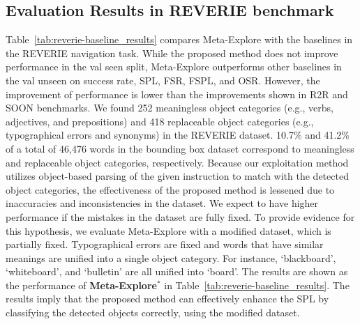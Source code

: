 \documentclass[10pt,twocolumn,letterpaper]{article}
\begin{document}
\subsection{Evaluation Results in REVERIE benchmark}
Table~\ref{tab:reverie-baseline_results} compares Meta-Explore with the baselines in the REVERIE navigation task. While the proposed method does not improve performance in the val seen split, Meta-Explore outperforms other baselines in the val unseen on success rate, SPL, FSR, FSPL, and OSR. However, the improvement of performance is lower than the improvements shown in R2R and SOON benchmarks. We found 252 meaningless object categories (e.g., verbs, adjectives, and prepositions) and 418 replaceable object categories (e.g., typographical errors and synonyms) in the REVERIE dataset. 10.7\% and 41.2\% of a total of 46,476 words in the bounding box dataset correspond to meaningless and replaceable object categories, respectively. Because our exploitation method utilizes object-based parsing of the given instruction to match with the detected object categories, the effectiveness of the proposed method is lessened due to inaccuracies and inconsistencies in the dataset. We expect to have higher performance if the mistakes in the dataset are fully fixed. 
To provide evidence for this hypothesis, we evaluate Meta-Explore with a modified dataset, which is partially fixed. Typographical errors are fixed and words that have similar meanings are unified into a single object category. For instance, `blackboard', `whiteboard', and `bulletin' are all unified into `board'. The results are shown as the performance of \textbf{Meta-Explore$^\ast$} in Table~\ref{tab:reverie-baseline_results}. The results imply that the proposed method can effectively enhance the SPL by classifying the detected objects correctly, using the modified dataset. 
\end{document}
